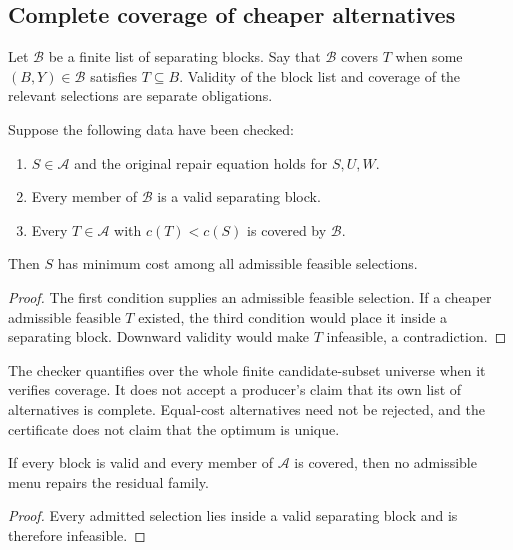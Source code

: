 \subsection{Complete coverage of cheaper alternatives}

Let $\mathcal B$ be a finite list of separating blocks. Say that $\mathcal B$ covers $T$ when some $(B,Y)\in\mathcal B$ satisfies $T\subseteq B$. Validity of the block list and coverage of the relevant selections are separate obligations.

\begin{CRtheorem}
Suppose the following data have been checked:
\begin{enumerate}
 \item $S\in\mathcal A$ and the original repair equation holds for $S,U,W$.
 \item Every member of $\mathcal B$ is a valid separating block.
 \item Every $T\in\mathcal A$ with $c(T)<c(S)$ is covered by $\mathcal B$.
\end{enumerate}
Then $S$ has minimum cost among all admissible feasible selections.
\end{CRtheorem}
\begin{proof}
The first condition supplies an admissible feasible selection. If a cheaper admissible feasible $T$ existed, the third condition would place it inside a separating block. Downward validity would make $T$ infeasible, a contradiction.
\end{proof}

The checker quantifies over the whole finite candidate-subset universe when it verifies coverage. It does not accept a producer's claim that its own list of alternatives is complete. Equal-cost alternatives need not be rejected, and the certificate does not claim that the optimum is unique.

\begin{CRtheorem}
If every block is valid and every member of $\mathcal A$ is covered, then no admissible menu repairs the residual family.
\end{CRtheorem}
\begin{proof}
Every admitted selection lies inside a valid separating block and is therefore infeasible.
\end{proof}

